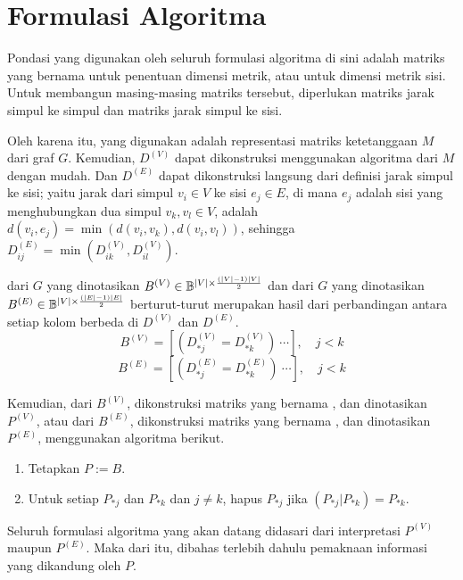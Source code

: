 \section{Formulasi Algoritma}
\label{sec:alg}

Pondasi yang digunakan oleh seluruh formulasi algoritma di sini adalah matriks yang bernama  untuk penentuan dimensi metrik, atau  untuk dimensi metrik sisi. Untuk membangun masing-masing matriks tersebut, diperlukan matriks jarak simpul ke simpul dan matriks jarak simpul ke sisi.

Oleh karena itu,  yang digunakan adalah representasi matriks ketetanggaan \(M\) dari graf \(G\). Kemudian, \(D^{(V)}\) dapat dikonstruksi menggunakan algoritma  \citep{floyd1962, warshall1962} dari \(M\) dengan mudah. Dan \(D^{(E)}\) dapat dikonstruksi langsung dari definisi jarak simpul ke sisi; yaitu jarak dari simpul \(v_i \in V\) ke sisi \(e_j \in E\), di mana \(e_j\) adalah sisi yang menghubungkan dua simpul \(v_k, v_l \in V\), adalah \(d(v_i,e_j) = \min(d(v_i, v_k), d(v_i, v_l))\), sehingga \(D^{(E)}_{ij} = \min(D^{(V)}_{ik}, D^{(V)}_{il})\).

 dari \(G\) yang dinotasikan \(B^{(V)} \in \Bbb^{|V|\times \frac{(|V|-1)|V|}{2}}\) dan  dari \(G\) yang dinotasikan \(B^{(E)} \in \Bbb^{|V|\times \frac{(|E|-1)|E|}{2}}\) berturut-turut merupakan hasil dari perbandingan antara setiap kolom berbeda di \(D^{(V)}\) dan \(D^{(E)}\).
	\[ B^{(V)} = [(D^{(V)}_{*j} = D^{(V)}_{*k})\ \cdots], \quad j < k\]
	\[ B^{(E)} = [(D^{(E)}_{*j} = D^{(E)}_{*k})\ \cdots], \quad j < k\]

Kemudian, dari \(B^{(V)}\), dikonstruksi matriks yang bernama , dan dinotasikan \(P^{(V)}\), atau dari \(B^{(E)}\), dikonstruksi matriks yang bernama , dan dinotasikan \(P^{(E)}\), menggunakan algoritma berikut.
\begin{enumerate}
	\item Tetapkan \(P := B\).
	\item Untuk setiap \(P_{*j}\) dan \(P_{*k}\) dan \(j \neq k\), hapus \(P_{*j}\) jika \((P_{*j} | P_{*k}) = P_{*k}\).
\end{enumerate}

Seluruh formulasi algoritma yang akan datang didasari dari interpretasi \(P^{(V)}\) maupun \(P^{(E)}\). Maka dari itu, dibahas terlebih dahulu pemaknaan informasi yang dikandung oleh \(P\).

